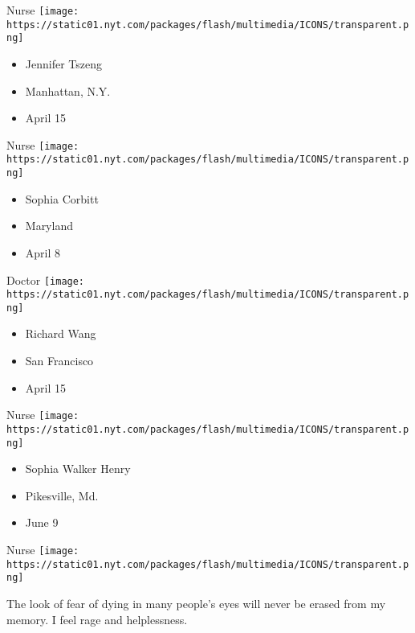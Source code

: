 \protect\hyperlink{item-jennifer-tszeng}{}

Nurse
\texttt{[image: https://static01.nyt.com/packages/flash/multimedia/ICONS/transparent.png]}

\begin{itemize}
\tightlist
\item
  Jennifer Tszeng
\item
  Manhattan, N.Y.
\item
  April 15
\end{itemize}

\protect\hyperlink{item-sophia-corbitt}{}

Nurse
\texttt{[image: https://static01.nyt.com/packages/flash/multimedia/ICONS/transparent.png]}

\begin{itemize}
\tightlist
\item
  Sophia Corbitt
\item
  Maryland
\item
  April 8
\end{itemize}

\protect\hyperlink{item-richard-wang}{}

Doctor
\texttt{[image: https://static01.nyt.com/packages/flash/multimedia/ICONS/transparent.png]}

\begin{itemize}
\tightlist
\item
  Richard Wang
\item
  San Francisco
\item
  April 15
\end{itemize}

\protect\hyperlink{item-sophia-walker-henry}{}

Nurse
\texttt{[image: https://static01.nyt.com/packages/flash/multimedia/ICONS/transparent.png]}

\begin{itemize}
\tightlist
\item
  Sophia Walker Henry
\item
  Pikesville, Md.
\item
  June 9
\end{itemize}

\protect\hyperlink{item-anna-duarte-velasco}{}

Nurse
\texttt{[image: https://static01.nyt.com/packages/flash/multimedia/ICONS/transparent.png]}

The look of fear of dying in many people's eyes will never be erased
from my memory. I feel rage and helplessness.


